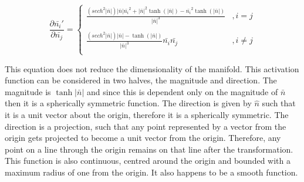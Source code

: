 \documentclass[onecolumn]{article}
\begin{document}
    \[\frac{\partial \bar{n_{i}}'}{\partial \bar{n_{j}}}=\left\{
    \begin{array}{ll}
        \frac{\left(sech^{2}|\bar{n}|\right)|\bar{n}|\bar{n_{i}}^{2}+|\bar{n}|^{2}\tanh\left( |\bar{n}|\right)-\bar{n_{i}}^{2}\tanh\left( |\bar{n}|\right)}{ |\bar{n}|^{3}} & ,i = j \\
        \\
        \frac{\left(sech^{2}|\bar{n}|\right)|\bar{n}|-\tanh\left(|\bar{n}|\right)}{ |\bar{n}|^{3}}\bar{n_{i}}\bar{n_{j}} & ,i \neq j \\
    \end{array} 
    \right. \]

    This equation does not reduce the dimensionality of the manifold. This activation function can be considered in two halves, the magnitude and direction. The magnitude is $\tanh|\bar{n}|$ and since this is dependent only on the magnitude of $\bar{n}$ then it is a spherically symmetric function. The direction is given by $\hat{n}$ such that it is a unit vector about the origin, therefore it is a spherically symmetric. The direction is a projection, such that any point represented by a vector from the origin gets projected to become a unit vector from the origin. Therefore, any point on a line through the origin remains on that line after the transformation. This function is also continuous, centred around the origin and bounded with a maximum radius of one from the origin. It also happens to be a smooth function.




\end{document}
